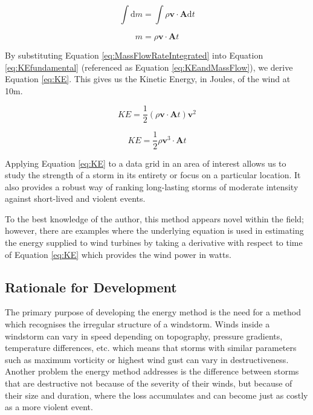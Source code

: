    \begin{equation}
    \label{eq:MassFlowRateIntegrating}
        \int \mathrm{d}m = \int \rho \mathbf{v} \cdot \mathbf{A} \mathrm{d}t
    \end{equation}

    \begin{equation}
    \label{eq:MassFlowRateIntegrated}
        m = \rho \mathbf{v} \cdot \mathbf{A} t
    \end{equation}

    By substituting Equation \ref{eq:MassFlowRateIntegrated} into Equation \ref{eq:KEfundamental} (referenced as Equation \ref{eq:KEandMassFlow}), we derive Equation \ref{eq:KE}. This gives us the Kinetic Energy, in Joules, of the wind at 10m.

    \begin{equation}
    \label{eq:KEandMassFlow}
        KE = \frac{1}{2} \left(\rho \mathbf{v} \cdot \mathbf{A} t \right) \mathbf{v}^2
    \end{equation}

    \begin{equation}
    \label{eq:KE}
        KE = \frac{1}{2} \rho \mathbf{v}^3 \cdot \mathbf{A} t
    \end{equation}

    Applying Equation \ref{eq:KE} to a data grid in an area of interest allows us to study the strength of a storm in its entirety or focus on a particular location. It also provides a robust way of ranking long-lasting storms of moderate intensity against short-lived and violent events.

    To the best knowledge of the author, this method appears novel within the field; however, there are examples \citep{web:psuWindEnergy} where the underlying equation is used in estimating the energy supplied to wind turbines by taking a derivative with respect to time of Equation \ref{eq:KE} which provides the wind power in watts.
    
    \subsection{Rationale for Development}

        The primary purpose of developing the energy method is the need for a method which recognises the irregular structure of a windstorm. Winds inside a windstorm can vary in speed depending on topography, pressure gradients, temperature differences, etc. which means that storms with similar parameters such as maximum vorticity or highest wind gust can vary in destructiveness. Another problem the energy method addresses is the difference between storms that are destructive not because of the severity of their winds, but because of their size and duration, where the loss accumulates and can become just as costly as a more violent event.

